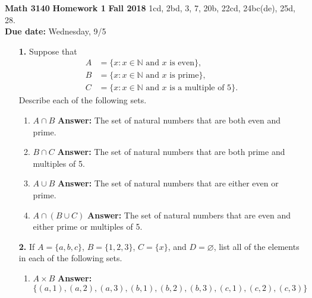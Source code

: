 \documentclass[12pt,reqno]{amsart}
\renewcommand{\emptyset}{\ensuremath{\varnothing}}
\begin{document}
\thispagestyle{empty}

\noindent \textbf{Math 3140} \hskip4cm {\bf Homework 1} \hfill {\bf Fall 2018}
\vskip1cm
  1cd, 2bd, 3, 7, 20b, 22cd, 24bc(de), 25d, 28.  \\
{\bf Due date:} Wednesday, 9/5

\medskip

\begin{enumerate}[{\bf 1.}]

\item[{\bf 1.}]
Suppose that
\begin{align*}
A & = \{ x : x \in \mathbb N \text{ and } x \text{ is even} \}, \\
B & = \{x : x \in \mathbb N \text{ and } x \text{ is prime}\}, \\
C & = \{ x : x \in \mathbb N \text{ and } x \text{ is a multiple of 5}\}.
\end{align*}
Describe each of the following sets. 
\begin{multicols}{2}
\begin{enumerate}

\item
$A \cap B$ \textbf{Answer:} The set of natural numbers that are both even and prime.

\item
$B \cap C$ \textbf{Answer:} The set of natural numbers that are both prime and multiples of 5.

\item
$A \cup B$ \textbf{Answer:} The set of natural numbers that are either even or prime.

\item
$A \cap (B \cup C)$ \textbf{Answer:} The set of natural numbers that are even and either prime or multiples of 5.

\end{enumerate}
\end{multicols}

\medskip  

\item[{\bf 2.}]
If $A = \{ a, b, c \}$, $B = \{ 1, 2, 3 \}$, $C = \{ x \}$, and 
$D = \emptyset$, list all of the elements in each of the following sets. 
\begin{multicols}{2}
\begin{enumerate}

\item
$A \times B$ \textbf{Answer:} $\{(a,1), (a,2), (a,3), (b,1), (b,2), (b,3), (c,1), (c,2), (c,3)\}$


\end{enumerate}
\end{multicols}
\end{enumerate}
\end{document}
